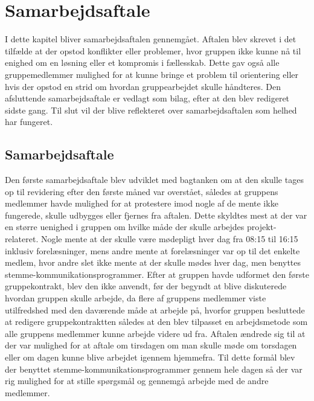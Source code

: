 \chapter{Samarbejdsaftale}\label{Samarbejdesaftale}
I dette kapitel bliver samarbejdsaftalen gennemgået. Aftalen blev skrevet i det tilfælde at der opstod konflikter eller problemer, hvor gruppen ikke kunne nå til enighed om en løsning eller et kompromis i fællesskab. Dette gav også alle gruppemedlemmer mulighed for at kunne bringe et problem til orientering eller hvis der opstod en strid om hvordan gruppearbejdet skulle håndteres. Den afsluttende samarbejdsaftale er vedlagt som bilag, efter at den blev redigeret sidste gang. Til slut vil der blive reflekteret over samarbejdsaftalen som helhed har fungeret.

\section{Samarbejdsaftale}

Den første samarbejdsaftale blev udviklet med bagtanken om at den skulle tages op til revidering efter den første måned var overstået, således at gruppens medlemmer havde mulighed for at protestere imod nogle af de mente ikke fungerede, skulle udbygges eller fjernes fra aftalen. Dette skyldtes mest at der var en større uenighed i gruppen om hvilke måde der skulle arbejdes projekt-relateret. Nogle mente at der skulle være mødepligt hver dag fra 08:15 til 16:15 inklusiv forelæsninger, mens andre mente at forelæsninger var op til det enkelte medlem, hvor andre slet ikke mente at der skulle mødes hver dag, men benyttes stemme-kommunikationsprogrammer. 
Efter at gruppen havde udformet den første gruppekontrakt, blev den ikke anvendt, før der begyndt at blive diskuterede hvordan gruppen skulle arbejde, da flere af gruppens medlemmer viste utilfredshed med den daværende måde at arbejde på, hvorfor gruppen besluttede at redigere gruppekontraktten således at den blev tilpasset en arbejdsmetode som alle gruppens medlemmer kunne arbejde videre ud fra. Aftalen ændrede sig til at der var mulighed for at aftale om tirsdagen om man skulle møde om torsdagen eller om dagen kunne blive arbejdet igennem hjemmefra. Til dette formål blev der benyttet stemme-kommunikationsprogrammer gennem hele dagen så der var rig mulighed for at stille spørgsmål og gennemgå arbejde med de andre medlemmer.

